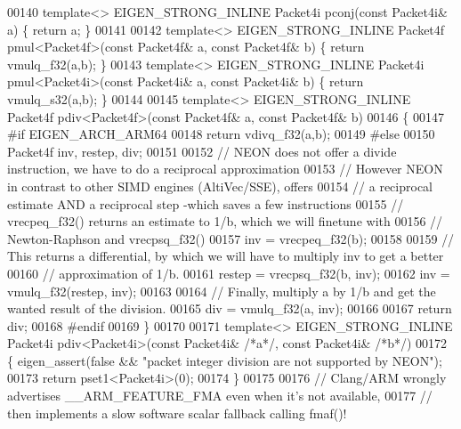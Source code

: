 \begin{DoxyCode}
{00140 \textcolor{keyword}{template}<> EIGEN\_STRONG\_INLINE Packet4i pconj(\textcolor{keyword}{const} Packet4i& a) \{ \textcolor{keywordflow}{return} a; \}
00141 
00142 \textcolor{keyword}{template}<> EIGEN\_STRONG\_INLINE Packet4f pmul<Packet4f>(\textcolor{keyword}{const} Packet4f& a, \textcolor{keyword}{const} Packet4f& b) \{ \textcolor{keywordflow}{return} 
      vmulq\_f32(a,b); \}
00143 \textcolor{keyword}{template}<> EIGEN\_STRONG\_INLINE Packet4i pmul<Packet4i>(\textcolor{keyword}{const} Packet4i& a, \textcolor{keyword}{const} Packet4i& b) \{ \textcolor{keywordflow}{return} 
      vmulq\_s32(a,b); \}
00144 
00145 \textcolor{keyword}{template}<> EIGEN\_STRONG\_INLINE Packet4f pdiv<Packet4f>(\textcolor{keyword}{const} Packet4f& a, \textcolor{keyword}{const} Packet4f& b)
00146 \{
00147 \textcolor{preprocessor}{#if EIGEN\_ARCH\_ARM64}
00148   \textcolor{keywordflow}{return} vdivq\_f32(a,b);
00149 \textcolor{preprocessor}{#else}
00150   Packet4f inv, restep, div;
00151 
00152   \textcolor{comment}{// NEON does not offer a divide instruction, we have to do a reciprocal approximation}
00153   \textcolor{comment}{// However NEON in contrast to other SIMD engines (AltiVec/SSE), offers}
00154   \textcolor{comment}{// a reciprocal estimate AND a reciprocal step -which saves a few instructions}
00155   \textcolor{comment}{// vrecpeq\_f32() returns an estimate to 1/b, which we will finetune with}
00156   \textcolor{comment}{// Newton-Raphson and vrecpsq\_f32()}
00157   inv = vrecpeq\_f32(b);
00158 
00159   \textcolor{comment}{// This returns a differential, by which we will have to multiply inv to get a better}
00160   \textcolor{comment}{// approximation of 1/b.}
00161   restep = vrecpsq\_f32(b, inv);
00162   inv = vmulq\_f32(restep, inv);
00163 
00164   \textcolor{comment}{// Finally, multiply a by 1/b and get the wanted result of the division.}
00165   div = vmulq\_f32(a, inv);
00166 
00167   \textcolor{keywordflow}{return} div;
00168 \textcolor{preprocessor}{#endif}
00169 \}
00170 
00171 \textcolor{keyword}{template}<> EIGEN\_STRONG\_INLINE Packet4i pdiv<Packet4i>(\textcolor{keyword}{const} Packet4i& \textcolor{comment}{/*a*/}, \textcolor{keyword}{const} Packet4i& \textcolor{comment}{/*b*/})
00172 \{ eigen\_assert(\textcolor{keyword}{false} && \textcolor{stringliteral}{"packet integer division are not supported by NEON"});
00173   \textcolor{keywordflow}{return} pset1<Packet4i>(0);
00174 \}
00175 
00176 \textcolor{comment}{// Clang/ARM wrongly advertises \_\_ARM\_FEATURE\_FMA even when it's not available,}
00177 \textcolor{comment}{// then implements a slow software scalar fallback calling fmaf()!}
}
\end{DoxyCode}
